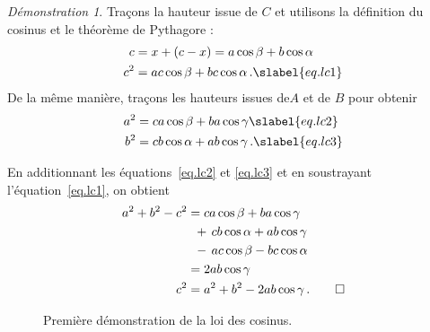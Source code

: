 \noindent \emph{Démonstration 1}.
Traçons la hauteur issue de $C$ et utilisons la définition du cosinus et le théorème de Pythagore :
\begin{subequations}
\begin{align}
c&= x+(c-x)=a\cos \beta + b\cos \alpha\\
c^2&=ac\cos \beta + bc\cos \alpha\,.\slabel{eq.lc1}
\end{align}
\end{subequations}
De la même manière, traçons  les hauteurs issues de$A$ et de $B$ pour obtenir 
\begin{subequations}
\begin{align}
a^2&=ca\cos \beta + ba\cos \gamma\slabel{eq.lc2}\\
b^2&=cb\cos \alpha + ab\cos \gamma\,.\slabel{eq.lc3}
\end{align}
\end{subequations}

En additionnant les équations~\ref{eq.lc2} et \ref{eq.lc3} et en soustrayant l'équation~\ref{eq.lc1}, on obtient 
\begin{align*}
a^2+b^2-c^2&=ca\cos \beta + ba\cos \gamma\\
&\;\; +\,cb\cos \alpha + ab\cos \gamma \\
&\;\; -\,ac\cos \beta - bc\cos \alpha\\
&=2ab\cos \gamma\\
c^2&=a^2+b^2-2ab\cos \gamma\,.\qed
\end{align*}


\begin{figure}[htbp]
\centering
     
\caption{Première démonstration de la loi des cosinus.}\label{f.law-cosines2}
\end{figure}




